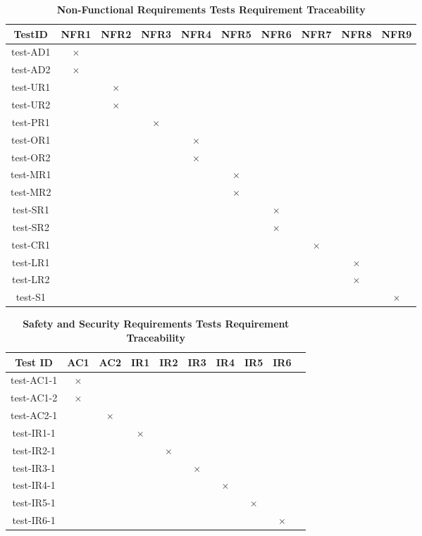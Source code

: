 \documentclass[12pt, titlepage]{article}
\begin{document}
\begin{landscape}
\begin{table} [H]
  \centering
  \begin{tabular}{|c|c|c|c|c|c|c|c|c|c|}
    \hline
    TestID & NFR1 & NFR2 & NFR3 & NFR4 & NFR5 & NFR6 & NFR7 & NFR8 & NFR9 \\
    \hline
    test-AD1 & $\times$ & & & & & & & & \\
    \hline
    test-AD2 &  $\times$ & & & & & & & & \\
    \hline
    test-UR1 & & $\times$ &  & & & & & & \\
    \hline
    test-UR2 & & $\times$ & & & & & & &  \\
    \hline
    test-PR1 & & & $\times$ & & & & & & \\
    \hline
    test-OR1 & & & & $\times$ & & & & &  \\
    \hline
    test-OR2 & & & & $\times$ & & & & & \\
    \hline
    test-MR1 & & & & & $\times$ & & & &\\
    \hline
    test-MR2 & & & & & $\times$ & & & &  \\
    \hline
    test-SR1 & & & & & & $\times$ & & &\\
    \hline
    test-SR2 & & & & & & $\times$ & & & \\
    \hline
    test-CR1 & & & & & & & $\times$ & &\\
    \hline
    test-LR1 & & & & & & & & $\times$ &\\
    \hline
    test-LR2 & & & & & & & & $\times$ & \\
    \hline
    test-S1 & & & & & & & & & $\times$ \\
    \hline
  \end{tabular}
\caption{\bf Non-Functional Requirements Tests Requirement Traceability} \label{tab:nfr-test-traceability}
\end{table}

\begin{table} [H]
  \centering
  \begin{tabular}{|c|c|c|c|c|c|c|c|c|c|}
  \hline
  Test ID & AC1 & AC2 & IR1 & IR2 & IR3 & IR4 & IR5 & IR6 \\
  \hline
  test-AC1-1 & $\times$ & & & & & & &   \\
  \hline
  test-AC1-2 & $\times$ & & & & & & &   \\
  \hline
  test-AC2-1 & & $\times$ & & & & & &   \\
  \hline
  test-IR1-1 & & & $\times$ & & & & &   \\
  \hline
  test-IR2-1  & & & & $\times$ & & & &  \\
  \hline
  test-IR3-1  & & & & & $\times$ & & &  \\
  \hline
  test-IR4-1  & & & & & & $\times$ & &  \\
  \hline
  test-IR5-1  & & & & & & &  $\times$ & \\
  \hline
  test-IR6-1  & & & & & & & &  $\times$ \\
  \hline
\end{tabular}
\caption{\bf Safety and Security Requirements Tests Requirement Traceability} \label{tab:sns-test-traceability}
\end{table}


\end{landscape}
\end{document}
